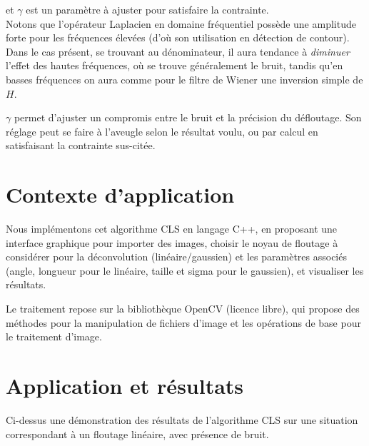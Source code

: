 \documentclass{article}
\begin{document}
	et $\gamma$ est un paramètre à ajuster pour satisfaire la contrainte.
	\\
	
	Notons que l'opérateur Laplacien en domaine fréquentiel possède une amplitude forte pour les fréquences élevées (d'où son utilisation en détection de contour). Dans le cas présent, se trouvant au dénominateur, il aura tendance à \textit{diminuer} l'effet des hautes fréquences, où se trouve généralement le bruit, tandis qu'en basses fréquences on aura comme pour le filtre de Wiener une inversion simple de $H$.
	
	$\gamma$ permet d'ajuster un compromis entre le bruit et la précision du défloutage. Son réglage peut se faire à l'aveugle selon le résultat voulu, ou par calcul en satisfaisant la contrainte sus-citée. 


\section{Contexte d'application}

	Nous implémentons cet algorithme CLS en langage C++, en proposant une interface graphique pour importer des images, choisir le noyau de floutage à considérer pour la déconvolution (linéaire/gaussien) et les paramètres associés (angle, longueur pour le linéaire, taille et sigma pour le gaussien), et visualiser les résultats.
	
	Le traitement repose sur la bibliothèque OpenCV (licence libre), qui propose des méthodes pour la manipulation de fichiers d'image et les opérations de base pour le traitement d'image.

\section{Application et résultats}

	Ci-dessus une démonstration des résultats de l'algorithme CLS sur une situation correspondant à un floutage linéaire, avec présence de bruit.
	
\end{document}
